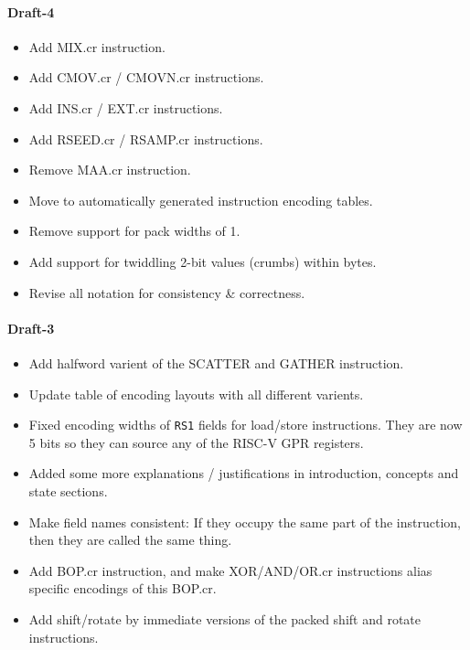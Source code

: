 \paragraph{Draft-4}
\begin{itemize}
\item Add MIX.cr instruction.
\item Add CMOV.cr / CMOVN.cr instructions.
\item Add INS.cr / EXT.cr instructions.
\item Add RSEED.cr / RSAMP.cr instructions.
\item Remove MAA.cr instruction.
\item Move to automatically generated instruction encoding tables.
\item Remove support for pack widths of 1.
\item Add support for twiddling 2-bit values (crumbs) within bytes.
\item Revise all notation for consistency \& correctness.
\end{itemize}

\paragraph{Draft-3}
\begin{itemize}
\item Add halfword varient of the SCATTER and GATHER instruction.
\item Update table of encoding layouts with all different varients.
\item Fixed encoding widths of {\tt RS1} fields for load/store
    instructions. They are now 5 bits so they can source any of the
    RISC-V GPR registers.
\item Added some more explanations / justifications in introduction,
    concepts and state sections.
\item Make field names consistent: If they occupy the same part of
    the instruction, then they are called the same thing.
\item Add BOP.cr instruction, and make XOR/AND/OR.cr instructions
    alias specific encodings of this BOP.cr.
\item Add shift/rotate by immediate versions of the packed
    shift and rotate instructions.
\end{itemize}

